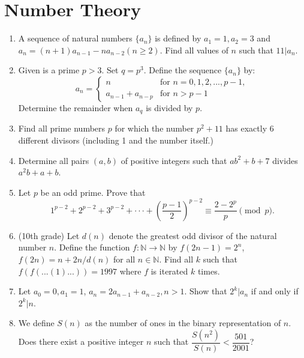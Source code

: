\documentclass[12pt]{article}
\begin{document}
\section*{Number Theory}

\begin{enumerate}[resume]
    \item A sequence of natural numbers $\{a_{n}\}$ is defined by $a_{1}=1, a_{2}=3$ and $a_{n}=(n+1)a_{n-1}-na_{n-2}(n\ge2)$. Find all values of $n$ such that $11|a_{n}$.

    \item Given is a prime $p>3$. Set $q=p^{3}$. Define the sequence $\{a_{n}\}$ by:
    $$a_{n}=\begin{cases}n & \text{for } n=0,1,2,...,p-1,\\ a_{n-1}+a_{n-p} & \text{for } n>p-1\end{cases}$$
    Determine the remainder when $a_{q}$ is divided by $p$.

    \item Find all prime numbers $p$ for which the number $p^{2}+11$ has exactly 6 different divisors (including 1 and the number itself.)

    \item Determine all pairs $(a, b)$ of positive integers such that $ab^{2}+b+7$ divides $a^{2}b+a+b$.

    \item Let $p$ be an odd prime. Prove that 
    $$1^{p-2}+2^{p-2}+3^{p-2}+\cdot\cdot\cdot+\left(\dfrac{p-1}{2}\right)^{p-2}\equiv\dfrac{2-2^{p}}{p} \pmod p.$$

    \item (10th grade) Let $d(n)$ denote the greatest odd divisor of the natural number $n$. Define the function $f:\mathbb{N}\rightarrow\mathbb{N}$ by $f(2n-1)=2^{n}$, $f(2n)=n+2n/d(n)$ for all $n\in\mathbb{N}.$ Find all $k$ such that $f(f(...(1)...))=1997$ where $f$ is iterated $k$ times.

    \item Let $a_0=0, a_{1}=1$, $a_{n}=2a_{n-1}+a_{n-2}, n>1$. Show that $2^{k}|a_{n}$ if and only if $2^{k}|n.$

    \item We define $S(n)$ as the number of ones in the binary representation of $n$. Does there exist a positive integer $n$ such that $\dfrac{S(n^{2})}{S(n)}<\dfrac{501}{2001}$?


\end{enumerate}
\end{document}
